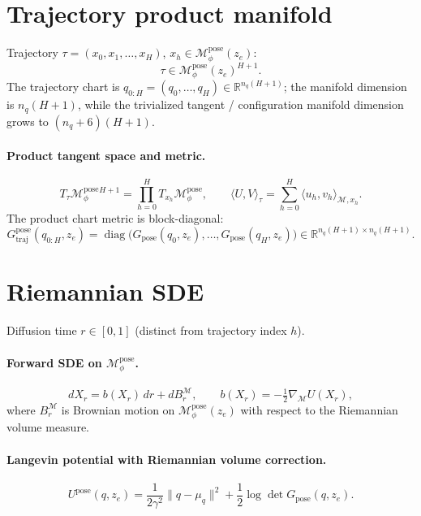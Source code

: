 \documentclass[11pt,a4paper]{article}
\newcommand{\R}{\mathbb{R}}
\newcommand{\Mset}{\mathcal{M}}
\newcommand{\Mpose}{\mathcal{M}_\phi^{\text{pose}}}
\begin{document}
\section{Trajectory product manifold}
\label{sec:product-manifold}

Trajectory $\tau = (x_0, x_1, \ldots, x_H)$, $x_h \in \Mpose(z_e)$:
\begin{equation}
\tau \in \Mpose(z_e)^{H+1}.
\end{equation}
The trajectory chart is $q_{0:H} = (q_0, \ldots, q_H) \in \R^{n_q (H+1)}$; the manifold dimension is $n_q(H+1)$, while the trivialized tangent / configuration manifold dimension grows to $(n_q + 6)(H+1)$.

\paragraph{Product tangent space and metric.}
\begin{equation}
T_\tau \Mpose^{H+1} = \prod_{h=0}^{H} T_{x_h} \Mpose, \qquad \langle U, V \rangle_\tau = \sum_{h=0}^{H} \langle u_h, v_h \rangle_{\Mset, x_h}.
\end{equation}
The product chart metric is block-diagonal:
\begin{equation}
G_{\text{traj}}^{\text{pose}}(q_{0:H}, z_e) = \operatorname{diag}\bigl( G_{\text{pose}}(q_0, z_e), \ldots, G_{\text{pose}}(q_H, z_e) \bigr) \in \R^{n_q(H+1) \times n_q(H+1)}.
\end{equation}

\section{Riemannian SDE}

Diffusion time $r \in [0, 1]$ (distinct from trajectory index $h$).

\paragraph{Forward SDE on $\Mpose$.}
\begin{equation}
dX_r = b(X_r) \, dr + dB^{\Mset}_r, \qquad b(X_r) = -\tfrac{1}{2} \nabla_{\Mset} U(X_r),
\end{equation}
where $B^{\Mset}_r$ is Brownian motion on $\Mpose(z_e)$ with respect to the Riemannian volume measure.

\paragraph{Langevin potential with Riemannian volume correction.}
\begin{equation}
\boxed{ U^{\text{pose}}(q, z_e) = \frac{1}{2 \gamma^2} \| q - \mu_q \|^2 + \frac{1}{2} \log \det G_{\text{pose}}(q, z_e). }
\end{equation}
\end{document}
